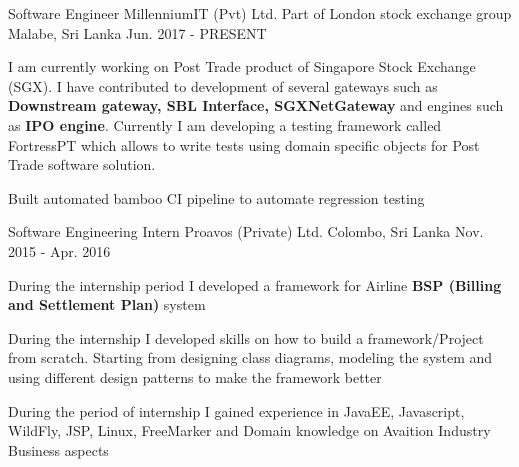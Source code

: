 

\begin{cventries}

  \cventry
    {Software Engineer} %
    {MillenniumIT (Pvt) Ltd. Part of London stock exchange group} %
    {Malabe, Sri Lanka} %
    {Jun. 2017 - PRESENT} %
    {
      \begin{cvitems} %
	\item {I am currently working on Post Trade product of Singapore Stock Exchange (SGX). I have contributed to development of several gateways such as 		\textbf{Downstream gateway, SBL Interface, SGXNetGateway} and engines such as \textbf{IPO engine}. Currently I am developing a testing framework 		called FortressPT which allows to write tests using domain specific objects for Post Trade software solution.}
	\item {Built automated bamboo CI pipeline to automate regression testing}
        \end{cvitems}
    }

  \cventry
    {Software Engineering Intern} %
    {Proavos (Private) Ltd.} %
    {Colombo, Sri Lanka} %
    {Nov. 2015 - Apr. 2016} %
    {
      \begin{cvitems} %
	\item {During the internship period I developed a framework for Airline \textbf{BSP (Billing and Settlement Plan)} system}
	\item {During the internship I developed skills on how to build a framework/Project from scratch. Starting from designing class diagrams, modeling the system and using different design patterns to make the framework better}
	\item {During the period of internship I gained experience in JavaEE, Javascript, WildFly, JSP, Linux, FreeMarker and Domain knowledge on Avaition Industry Business aspects}
        \end{cvitems}
    }

\end{cventries}
